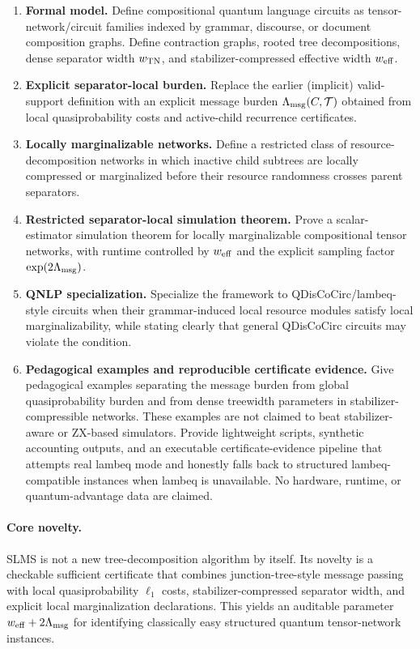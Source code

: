 \begin{enumerate}[label=\textbf{Contribution \arabic*:},leftmargin=2.5cm]
\item \textbf{Formal model.}
Define compositional quantum language circuits as tensor-network/circuit families indexed by grammar, discourse, or document composition graphs. Define contraction graphs, rooted tree decompositions, dense separator width \(w_{\mathrm{TN}}\), and stabilizer-compressed effective width \(w_{\mathrm{eff}}\).

\item \textbf{Explicit separator-local burden.}
Replace the earlier (implicit) valid-support definition with an explicit message burden \(\Lambda_{\mathrm{msg}}(C,\mathcal{T})\) obtained from local quasiprobability costs and active-child recurrence certificates.

\item \textbf{Locally marginalizable networks.}
Define a restricted class of resource-decomposition networks in which inactive child subtrees are locally compressed or marginalized before their resource randomness crosses parent separators.

\item \textbf{Restricted separator-local simulation theorem.}
Prove a scalar-estimator simulation theorem for locally marginalizable compositional tensor networks, with runtime controlled by \(w_{\mathrm{eff}}\) and the explicit sampling factor \(\exp(2\Lambda_{\mathrm{msg}})\).

\item \textbf{QNLP specialization.}
Specialize the framework to QDisCoCirc/lambeq-style circuits when their grammar-induced local resource modules satisfy local marginalizability, while stating clearly that general QDisCoCirc circuits may violate the condition.

\item \textbf{Pedagogical examples and reproducible certificate evidence.}
Give pedagogical examples separating the message burden from global quasiprobability burden and from dense treewidth parameters in stabilizer-compressible networks. These examples are not claimed to beat stabilizer-aware or ZX-based simulators. Provide lightweight scripts, synthetic accounting outputs, and an executable certificate-evidence pipeline that attempts real lambeq mode and honestly falls back to structured lambeq-compatible instances when lambeq is unavailable. No hardware, runtime, or quantum-advantage data are claimed.
\end{enumerate}

\paragraph{Core novelty.}
SLMS is not a new tree-decomposition algorithm by itself. Its novelty is a checkable sufficient certificate that combines junction-tree-style message passing with local quasiprobability \(\ell_1\) costs, stabilizer-compressed separator width, and explicit local marginalization declarations. This yields an auditable parameter \(w_{\mathrm{eff}}+2\Lambda_{\mathrm{msg}}\) for identifying classically easy structured quantum tensor-network instances.

